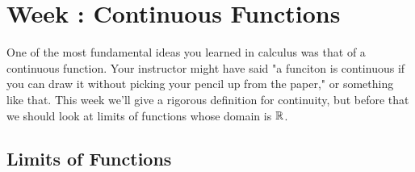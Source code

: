 \documentclass[../notes.tex]{subfiles}
\begin{document}
\section{Week \theweek: Continuous Functions}

One of the most fundamental ideas you learned in calculus was that of a continuous function. Your instructor might have said "a funciton is continuous if you can draw it without picking your pencil up from the paper," or something like that. This week we'll give a rigorous definition for continuity, but before that we should look at limits of functions whose domain is $\mathbb R$.

\subsection{Limits of Functions}
\end{document}
